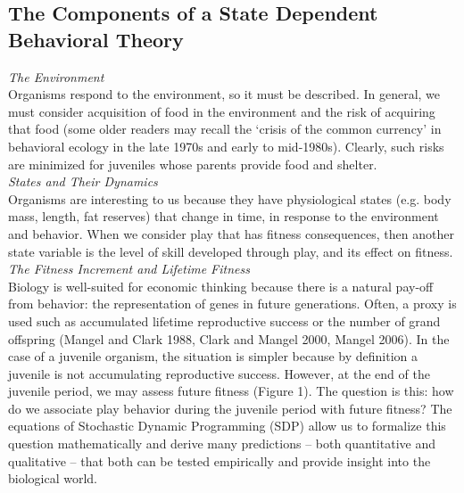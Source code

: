 \documentclass[12pt, letterpaper, fleqn]{article}
\begin{document}
	\subsection*{The Components of a State Dependent Behavioral Theory }
	
	\textit{The Environment} \\
	Organisms respond to the environment, so it must be described.  
	In general, we must consider acquisition of food in the environment and the risk of acquiring that food (some older readers may recall the `crisis of the common currency' in behavioral ecology in the late 1970s and early to mid-1980s).  
	Clearly, such risks are minimized for juveniles whose parents provide food and shelter.\\

	
	\noindent\textit{States and Their Dynamics} \\
	Organisms are interesting to us because they have physiological states (e.g. body mass, length, fat reserves) that change in time, in response to the environment and behavior.  
	When we consider play that has fitness consequences, then another state variable is the level of skill developed through play, and its effect on fitness. \\
	
	
	\noindent\textit{The Fitness Increment and Lifetime Fitness} \\
	Biology is well-suited for economic thinking because there is a natural pay-off from behavior: the representation of genes in future generations.  
	Often, a proxy is used such as accumulated lifetime reproductive success or the number of grand offspring (Mangel and Clark 1988, Clark and Mangel 2000, Mangel 2006).  
	In the case of a juvenile organism, the situation is simpler because by definition a juvenile is not accumulating reproductive success.  
	However, at the end of the juvenile period, we may assess future fitness (Figure 1). 
	The question is this: how do we associate play behavior during the juvenile period with future fitness? 
	The equations of Stochastic Dynamic Programming (SDP) allow us to formalize this question mathematically and derive many predictions -- both quantitative and qualitative -- that both can be tested empirically and provide insight into the biological world. \\ 
\end{document}
